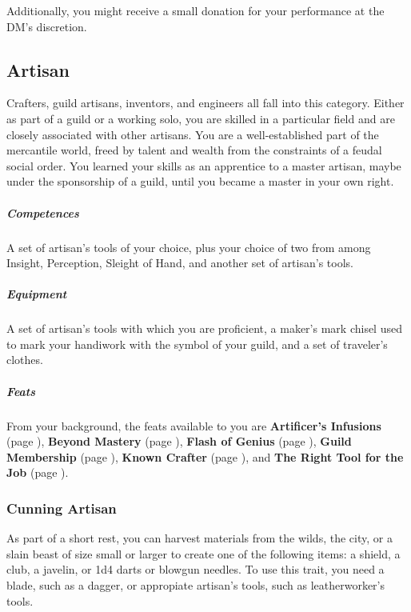         Additionally, you might receive a small donation for your performance at the DM's discretion.

\subsection*{Artisan} \label{ssec::artisan}
    Crafters, guild artisans, inventors, and engineers all fall into this category.
    Either as part of a guild or a working solo, you are skilled in a particular field and are closely associated with other artisans.
    You are a well-established part of the mercantile world, freed by talent and wealth from the constraints of a feudal social order.
    You learned your skills as an apprentice to a master artisan, maybe under the sponsorship of a guild, until you became a master in your own right.

    \subparagraph{Competences} A set of artisan's tools of your choice, plus your choice of two from among Insight, Perception, Sleight of Hand, and another set of artisan's tools.

    \subparagraph{Equipment} A set of artisan's tools with which you are proficient, a maker's mark chisel used to mark your handiwork with the symbol of your guild, and a set of traveler's clothes.

    \subparagraph{Feats} From your background, the feats available to you are
    \textbf{Artificer's Infusions} (page \pageref{feat::artificersinfusion}),
    \textbf{Beyond Mastery} (page \pageref{feat::beyondmastery}),
    \textbf{Flash of Genius} (page \pageref{feat::flashofgenius}),
    \textbf{Guild Membership} (page \pageref{feat::guildmembership}),
    \textbf{Known Crafter} (page \pageref{feat::knowncrafter}), and
    \textbf{The Right Tool for the Job} (page \pageref{feat::therighttoolforthejob}).

    \subsubsection{Cunning Artisan} \label{feat::cunningartisan}
        As part of a short rest, you can harvest materials from the wilds, the city, or a slain beast of size small or larger to create one of the following items: a shield, a club, a javelin, or 1d4 darts or blowgun needles.
        To use this trait, you need a blade, such as a dagger, or appropiate artisan's tools, such as leatherworker's tools.

